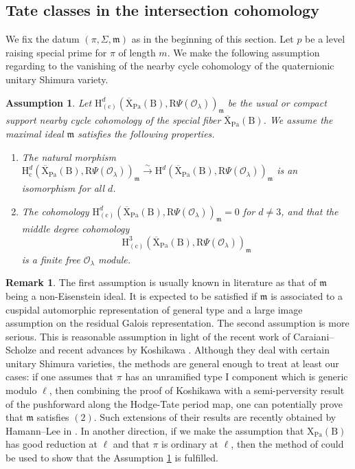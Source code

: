 \documentclass[10pt]{amsart}
\numberwithin{equation}{section}
\newtheorem{assumption}[equation]{Assumption}
\theoremstyle{definition}
\newtheorem{remark}[equation]{Remark}
\def\Pa{\mathrm{Pa}}
\def\calO{\mathcal{O}}
\def\fracm{\mathfrak{m}}
\def\rmc{\mathrm{c}}
\def\rmB{\mathrm{B}}
\def\rmH{\mathrm{H}}
\def\rmI{\mathrm{I}}
\def\rmR{\mathrm{R}}
\def\rmX{\mathrm{X}}
\begin{document}
\subsection{Tate classes in the intersection cohomology} We fix the datum $(\pi, \Sigma, \fracm)$ as in the beginning of this section. Let $p$ be a level raising special prime for $\pi$ of length $m$.  We make the following assumption regarding to the vanishing of the nearby cycle cohomology of the quaternionic unitary Shimura variety.
\begin{assumption}\label{vanishing}
Let $\rmH^{d}_{(\rmc)}(\overline{\rmX}_{\Pa}(\rmB), \rmR\Psi(\calO_{\lambda}))_{\fracm}$ be the usual or compact support nearby cycle cohomology of the special fiber $\overline{\rmX}_{\Pa}(\rmB)$. We assume the maximal ideal $\fracm$ satisfies the following properties.
\begin{enumerate}
\item The natural morphism $\rmH^{d}_{\rmc}(\overline{\rmX}_{\Pa}(\rmB), \rmR\Psi(\calO_{\lambda}))_{\fracm}\xrightarrow{\sim} \rmH^{d}(\overline{\rmX}_{\Pa}(\rmB), \rmR\Psi(\calO_{\lambda}))_{\fracm}$ is an isomorphism for all $d$.
\item The cohomology $\rmH^{d}_{(\rmc)}(\overline{\rmX}_{\Pa}(\rmB), \rmR\Psi(\calO_{\lambda}))_{\fracm}=0$ for $d\neq 3$, and that the middle degree cohomology 
\begin{equation*}
\rmH^{3}_{(\rmc)}(\overline{\rmX}_{\Pa}(\rmB), \rmR\Psi(\calO_{\lambda}))_{\fracm} 
\end{equation*}
is a finite free $\calO_{\lambda}$ module. 
\end{enumerate}
\end{assumption}

\begin{remark}The first assumption is usually known in literature as that of $\fracm$ being a non-Eisenstein ideal. It is expected to be satisfied if $\fracm$ is associated to a cuspidal automorphic representation of general type and a large image assumption on the residual Galois representation. The second assumption is more serious. This is reasonable assumption in light of the recent work of Caraiani--Scholze \cite{CS-compact, CS-non-compact} and recent advances by Koshikawa \cite{Kos-a, Kos-b}. Although they deal with certain unitary Shimura varieties, the methods are general enough to treat at least our cases: if one assumes that $\pi$ has an unramified type $\rmI$ component which is generic modulo $\ell$, then combining the proof of  Koshikawa \cite{Kos-b} with a semi-perversity result of the pushforward along the Hodge-Tate period map, one can potentially prove that $\fracm$ satisfies $(2)$. Such extensions of their results are recently obtained by Hamann--Lee in \cite[Corollary 5.6]{HL-vanishing}. In another direction, if we make the assumption that $\rmX_{\Pa}(\rmB)$ has good reduction at $\ell$ and that $\pi$ is ordinary at $\ell$, then the method of \cite{MT-van} could be used to show that the Assumption \ref{vanishing} is fulfilled.

\end{remark}
\end{document}
